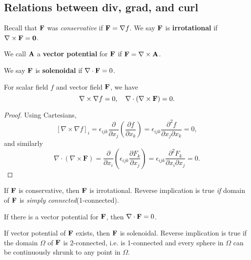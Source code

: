 \subsection{Relations between div, grad, and curl}
\begin{definition}
    Recall that ${\bf F}$ was \textit{conservative} if $ {\bf F}=\nabla f $. We say ${\bf F}$ is \textbf{irrotational} if $ \nabla\times {\bf F}= \mathbf{0} $.
\end{definition}
\begin{definition}
    We call ${\bf A}$ a \textbf{vector potential} for ${\bf F}$ if $ {\bf F} = \nabla\times {\bf A} $.
\end{definition}
\begin{definition}
    We say ${\bf F}$ is \textbf{solenoidal} if $ \nabla\cdot{\bf F} = 0 $.
\end{definition}
\begin{proposition}
    For scalar field $f$ and vector field $ {\bf F} $, we have 
    \[
        \nabla\times \nabla f = 0,\quad \nabla\cdot (\nabla\times {\bf F}) = 0.
    \]
\end{proposition}
\begin{proof}
    Using Cartesians,
    \[
        [\nabla \times \nabla f]_{i}=\epsilon_{i j k} \frac{\partial}{\partial x_{j}}\left(\frac{\partial f}{\partial x_{k}}\right)=\epsilon_{i j k} \frac{\partial^{2} f}{\partial x_{j} \partial x_{k}}=0,
    \]
    and similarly 
    \[
        \nabla \cdot(\nabla \times \mathbf{F})=\frac{\partial}{\partial x_{i}}\left(\epsilon_{i j k} \frac{\partial F_{k}}{\partial x_{j}}\right)=\epsilon_{i j k} \frac{\partial^{2} F_{k}}{\partial x_{i} \partial x_{j}}=0.
    \]
\end{proof}
\begin{corollary}
    If ${\bf F}$ is conservative, then ${\bf F}$ is irrotational. Reverse implication is true \textit{if} domain of ${\bf F}$ is \textit{simply connected}(1-connected). 
\end{corollary}
\begin{corollary}
    If there is a vector potential for ${\bf F}$, then $ \nabla\cdot{\bf F} = 0 $.
\end{corollary}
\begin{corollary}
    If vector potential of ${\bf F}$ exists, then ${\bf F}$ is solenoidal. Reverse implication is true if the domain $ \Omega $ of ${\bf F}$ is 2-connected, i.e. is 1-connected and every sphere in $ \Omega $ can be continuously shrunk to any point in $ \Omega $. 
\end{corollary}
